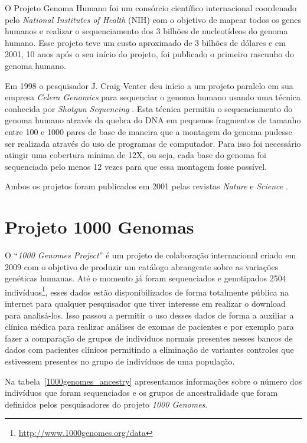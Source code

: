 O Projeto Genoma Humano \cite{Lander2001} foi um consórcio científico internacional coordenado pelo \textit{National Institutes of Health} (NIH) com o objetivo de mapear todos os genes humanos e realizar o sequenciamento dos 3 bilhões de nucleotídeos do genoma humano.  Esse projeto teve um custo aproximado de 3 bilhões de dólares e em 2001, 10 anos após o seu início do projeto, foi publicado o primeiro rascunho do genoma humano.

Em 1998 o pesquisador J. Craig Venter deu início a um projeto paralelo em sua empresa \textit{Celera Genomics} para sequenciar o genoma humano usando uma técnica conhecida por \textit{Shotgun Sequencing} \cite{Venter2001}. Esta técnica permitiu o sequenciamento do genoma humano através da quebra do DNA em pequenos fragmentos de tamanho entre 100 e 1000 pares de base de maneira que a montagem do genoma pudesse ser realizada através do uso de programas de computador. Para isso foi necessário atingir uma cobertura mínima de 12X, ou seja, cada base do genoma foi sequenciada pelo menos 12 vezes para que essa montagem fosse possível.

Ambos os projetos foram publicados em 2001 pelas revistas \textit{Nature} e \textit{Science} \cite{Lander2001, Venter2001}.


\section{Projeto 1000 Genomas}

O ``\textit{1000 Genomes Project}'' \cite{Abecasis2010, Abecasis2012} é um projeto de colaboração internacional criado em 2009 com o objetivo de produzir um catálogo abrangente sobre as variações genéticas humanas. Até o momento já foram sequenciados e genotipados 2504 indivíduos\footnote{\url{http://www.1000genomes.org/data}}, esses dados estão disponibilizados de forma totalmente pública na internet para qualquer pesquisador que tiver interesse em realizar o download para analisá-los. Isso passou a permitir o uso desses dados de forma a auxiliar a clínica médica para realizar análises de exomas de pacientes e por exemplo para fazer a comparação de grupos de indivíduos normais presentes nesses bancos de dados com pacientes clínicos permitindo a eliminação de variantes controles que estivessem presentes no grupo de indivíduos de uma população.

Na tabela~\ref{1000genomes_ancestry} apresentamos informações sobre o número dos indivíduos que foram sequenciados e os grupos de ancestralidade que foram definidos pelos pesquisadores do projeto \textit{1000 Genomes}.

